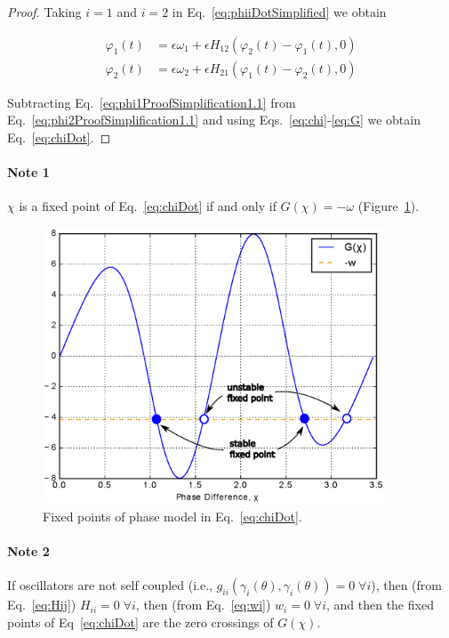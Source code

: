 \documentclass{article}
\begin{document}
\begin{proof}
Taking $i=1$ and $i=2$ in Eq.~\ref{eq:phiiDotSimplified} we obtain

\begin{align}
\varphi_1(t)&=\epsilon\omega_1+\epsilon H_{12}(\varphi_2(t)-\varphi_1(t),0)\label{eq:phi1ProofSimplification1.1}\\
\varphi_2(t)&=\epsilon\omega_2+\epsilon H_{21}(\varphi_1(t)-\varphi_2(t),0)\label{eq:phi2ProofSimplification1.1}
\end{align}

Subtracting Eq.~\ref{eq:phi1ProofSimplification1.1} from
Eq.~\ref{eq:phi2ProofSimplification1.1} and using Eqs.~\ref{eq:chi}-\ref{eq:G}
we obtain Eq.~\ref{eq:chiDot}.

\end{proof}

\paragraph{Note 1} $\chi$ is a fixed point of Eq.~\ref{eq:chiDot} if and only
if $G(\chi)=-\omega$ (Figure~\ref{fig:fixedPoints}).

\begin{figure}
\begin{center}
\includegraphics[width=4in]{figures/fig10_30INapIKLowThresholdWithSelfCouplingStrength-3.00I035.00-annotated.eps}
\end{center}
\caption{Fixed points of phase model in Eq.~\ref{eq:chiDot}.}
\label{fig:fixedPoints}
\end{figure}

\paragraph{Note 2} If oscillators are not self coupled (i.e.,
$g_{ii}(\gamma_i(\theta),\gamma_i(\theta))=0\;\forall i$), then (from
Eq.~\ref{eq:Hij}) $H_{ii}=0\;\forall i$, then (from Eq.~\ref{eq:wi})
$w_i=0\;\forall i$, and then the fixed points of Eq~\ref{eq:chiDot} are the
zero crossings of $G(\chi)$.
\end{document}
